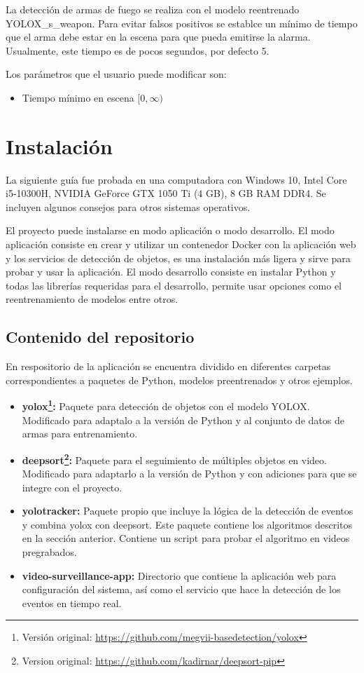 \documentclass[11pt,a4paper]{article}
\begin{document}
La detección de armas de fuego se realiza con el modelo reentrenado YOLOX\_s\_weapon. Para evitar falsos positivos se establce un mínimo de tiempo que el arma debe estar en la escena para que pueda emitirse la alarma. Usualmente, este tiempo es de pocos segundos, por defecto 5.


Los parámetros que el usuario puede modificar son:

\begin{itemize}
    \item Tiempo mínimo en escena $[0, \infty)$
\end{itemize}

\section{Instalación}

La siguiente guía fue probada en una computadora con Windows 10, Intel Core i5-10300H, NVIDIA GeForce GTX 1050 Ti (4 GB), 8 GB RAM DDR4. Se incluyen algunos consejos para otros sistemas operativos.

El proyecto puede instalarse en modo aplicación o modo desarrollo. El modo aplicación consiste en crear y utilizar un contenedor Docker con la aplicación web y los servicios de detección de objetos, es una instalación más ligera y sirve para probar y usar la aplicación. El modo desarrollo consiste en instalar Python y todas las librerías requeridas para el desarrollo, permite usar opciones como el reentrenamiento de modelos entre otros.

\subsection{Contenido del repositorio}

En respositorio de la aplicación se encuentra dividido en diferentes carpetas correspondientes a paquetes de Python, modelos preentrenados y otros ejemplos.

\begin{itemize}
    \item \textbf{yolox\footnote{Versión original: \url{https://github.com/megvii-basedetection/yolox}}:} Paquete para detección de objetos con el modelo YOLOX. Modificado para adaptalo a la versión de Python y al conjunto de datos de armas para entrenamiento.
    \item \textbf{deepsort\footnote{Version original: \url{https://github.com/kadirnar/deepsort-pip}}:} Paquete para el seguimiento de múltiples objetos en video. Modificado para adaptarlo a la versión de Python y con adiciones para que se integre con el proyecto.
    \item \textbf{yolotracker:} Paquete propio que incluye la lógica de la detección de eventos y combina yolox con deepsort. Este paquete contiene los algoritmos descritos en la sección anterior. Contiene un script para probar el algoritmo en videos pregrabados.
    \item \textbf{video-surveillance-app:} Directorio que contiene la aplicación web para configuración del sistema, así como el servicio que hace la detección de los eventos en tiempo real.
\end{itemize}
\end{document}
